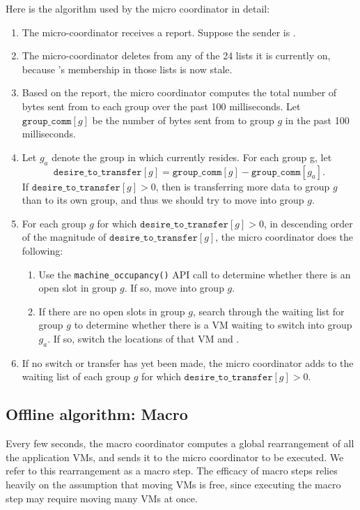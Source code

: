 \documentclass[11pt]{article}
\begin{document}
Here is the algorithm used by the micro coordinator in detail:
\begin{enumerate}
  \item The micro-coordinator receives a report.  Suppose the sender is \VMa.
  \item The micro-coordinator deletes \VMa from any of the 24 lists it is currently on, because \VMa's membership in those lists is now stale.
  \item Based on the report, the micro coordinator computes the total number of bytes sent from \VMa to each group over the past 100 milliseconds.  Let $\texttt{group\_comm}[g]$ be the number of bytes sent from \VMa to group $g$ in the past 100 milliseconds.
  \item Let $g_a$ denote the group in which \VMa currently resides.  For each group g, let
    \[ \texttt{desire\_to\_transfer}[g] = \texttt{group\_comm}[g] - \texttt{group\_comm}[g_a]. \]
    If $\texttt{desire\_to\_transfer}[g] > 0$, then \VMa is transferring more data to group $g$ than to its own group, and thus we should try to move \VMa into group $g$.
  \item For each group $g$ for which $\texttt{desire\_to\_transfer}[g] > 0$, in descending order of the magnitude of $\texttt{desire\_to\_transfer}[g]$, the micro coordinator does the following:
    \begin{enumerate}[label=(\alph{*})]
      \item Use the \texttt{machine\_occupancy()} API call to determine whether there is an open slot in group $g$.  If so, move \VMa into group $g$.
      \item If there are no open slots in group $g$, search through the waiting list for group $g$ to determine whether there is a VM waiting to switch into group $g_a$.  If so, switch the locations of that VM and \VMa.
    \end{enumerate}

  \item If no switch or transfer has yet been made, the micro coordinator adds \VMa to the waiting list of each group $g$ for which $\texttt{desire\_to\_transfer}[g] > 0$.
\end{enumerate}


\FloatBarrier

\subsection{Offline algorithm: Macro}

Every few seconds, the macro coordinator computes a global rearrangement of all the application VMs, and sends it to the micro coordinator to be executed.  We refer to this rearrangement as a macro step.  The efficacy of macro steps relies heavily on the assumption that moving VMs is free, since executing the macro step may require moving many VMs at once.
\end{document}
